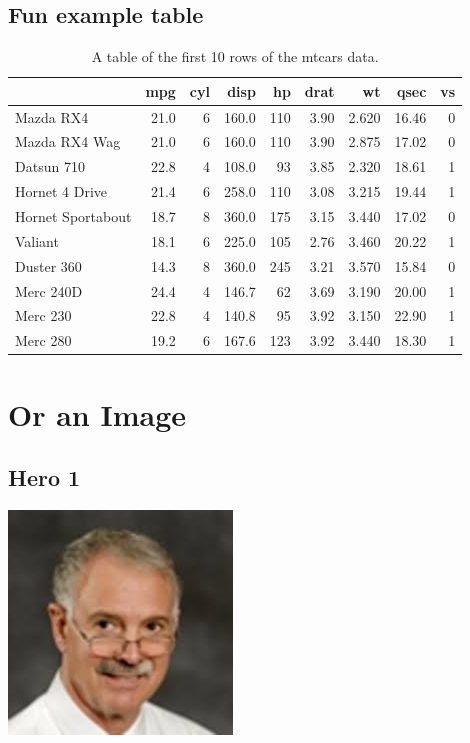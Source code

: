 \documentclass[
]{book}
\begin{document}
\hypertarget{fun-example-table}{%
\subsection{Fun example table}\label{fun-example-table}}

\begin{table}

\caption{\label{tab:unnamed-chunk-5}A table of the first 10 rows of the mtcars data.}
\centering
\begin{tabular}[t]{lrrrrrrrr}
\toprule
  & mpg & cyl & disp & hp & drat & wt & qsec & vs\\
\midrule
Mazda RX4 & 21.0 & 6 & 160.0 & 110 & 3.90 & 2.620 & 16.46 & 0\\
Mazda RX4 Wag & 21.0 & 6 & 160.0 & 110 & 3.90 & 2.875 & 17.02 & 0\\
Datsun 710 & 22.8 & 4 & 108.0 & 93 & 3.85 & 2.320 & 18.61 & 1\\
Hornet 4 Drive & 21.4 & 6 & 258.0 & 110 & 3.08 & 3.215 & 19.44 & 1\\
Hornet Sportabout & 18.7 & 8 & 360.0 & 175 & 3.15 & 3.440 & 17.02 & 0\\
\addlinespace
Valiant & 18.1 & 6 & 225.0 & 105 & 2.76 & 3.460 & 20.22 & 1\\
Duster 360 & 14.3 & 8 & 360.0 & 245 & 3.21 & 3.570 & 15.84 & 0\\
Merc 240D & 24.4 & 4 & 146.7 & 62 & 3.69 & 3.190 & 20.00 & 1\\
Merc 230 & 22.8 & 4 & 140.8 & 95 & 3.92 & 3.150 & 22.90 & 1\\
Merc 280 & 19.2 & 6 & 167.6 & 123 & 3.92 & 3.440 & 18.30 & 1\\
\bottomrule
\end{tabular}
\end{table}

\hypertarget{or-an-image}{%
\section{Or an Image}\label{or-an-image}}

\hypertarget{hero-1}{%
\subsection{Hero 1}\label{hero-1}}

\begin{center}\includegraphics{_images/bob} \end{center}
\end{document}
